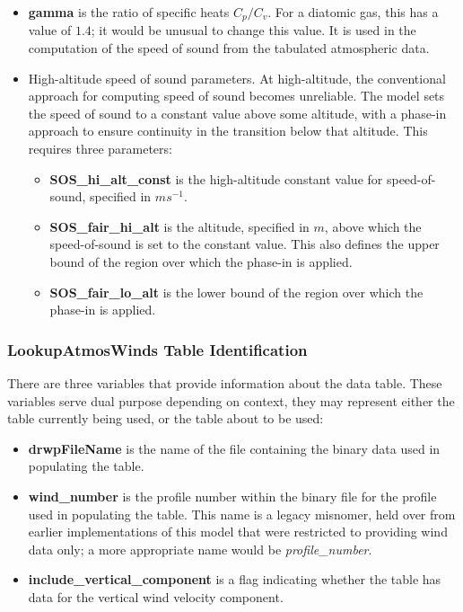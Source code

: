 \documentclass[11pt,fleqn]{report}
\begin{document}
\begin{itemize}
\begin{itemize}
    rather than by filename/profile-number.
  \end{itemize}
\item \textbf{gamma} is the ratio of specific heats $C_p / C_v$. For a
  diatomic gas, this has a value of $1.4$; it would be unusual to change
  this value. It is used in the computation of
  the speed of sound from the tabulated atmospheric data.
\item High-altitude speed of sound parameters. At high-altitude, the
  conventional approach for computing speed of sound becomes unreliable. The
  model sets the speed of sound to a constant value above some altitude,
  with a phase-in approach to ensure continuity in the transition below that
  altitude. This
  requires three parameters:
  \begin{itemize}
  \item\textbf{SOS\_hi\_alt\_const} is the high-altitude constant value for
    speed-of-sound, specified in $m s^{-1}$.
  \item\textbf{SOS\_fair\_hi\_alt} is the altitude, specified in $m$,
    above which the
    speed-of-sound is set to the constant value. This also defines the upper
    bound of the region over which the phase-in is applied.
  \item\textbf{SOS\_fair\_lo\_alt} is the lower bound of the
    region over which the phase-in is applied.
  \end{itemize}
\end{itemize}

\subsubsection{LookupAtmosWinds Table Identification}
There are three variables that provide information about the data table.
These variables serve dual purpose depending on context, they may represent
either the table currently being used, or the table about to be used:

\begin{itemize}
\item \textbf{drwpFileName} is the name of the file containing the binary
data used in populating the table.
\item \textbf{wind\_number} is the profile number within the binary file for
the profile used in populating the table. This name is a legacy misnomer,
held over from earlier implementations of this model that were restricted
to providing wind data only; a more appropriate name would be
\textit{profile\_number}.
\item \textbf{include\_vertical\_component} is a flag indicating whether the
table has data for the vertical wind velocity component.
\end{itemize}
\end{document}
